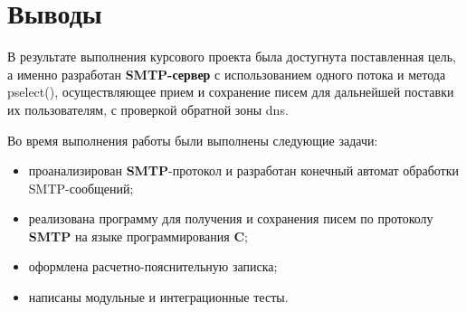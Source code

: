 \documentclass[a4paper,12pt]{report}
\begin{document}

\chapter*{Выводы}


В результате выполнения курсового проекта была достугнута поставленная цель, а именно разработан
\textbf{SMTP-сервер} с использованием одного потока и метода pselect(), осуществляющее прием и сохранение писем
для дальнейшей поставки их пользователям, с проверкой обратной зоны dns.

Во время выполнения работы были выполнены следующие задачи:
\begin{itemize}
    \item проанализирован \textbf{SMTP}-протокол и разработан конечный автомат обработки SMTP-сообщений;
    \item реализована программу для получения и сохранения писем по протоколу \textbf{SMTP} на языке программирования \textbf{C};
    \item оформлена расчетно-пояснительную записка;
	\item написаны модульные и интеграционные тесты.
\end{itemize}
\end{document}

